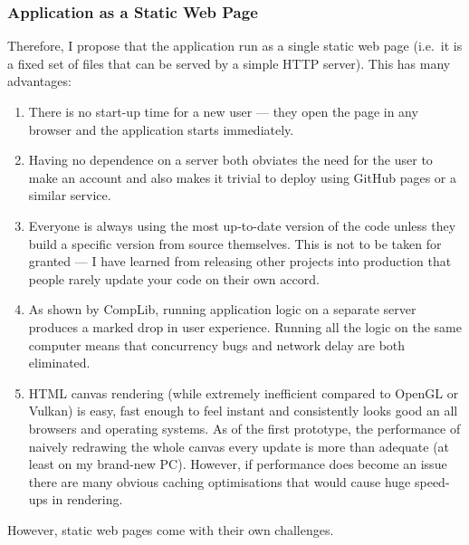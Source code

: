 \documentclass[12pt]{article}
\newcommand{\br}[0]{\vspace{10pt} \noindent}
\begin{document}
\subsubsection{Application as a Static Web Page}

Therefore, I propose that the application run as a single static web page (i.e.\ it is a fixed set
of files that can be served by a simple HTTP server).  This has many advantages:
\begin{enumerate}
    \item There is no start-up time for a new user --- they open the page in any browser and the
        application starts immediately.
    \item Having no dependence on a server both obviates the need for the user to make an account
        and also makes it trivial to deploy using GitHub pages or a similar service.
    \item Everyone is always using the most up-to-date version of the code unless they build a
        specific version from source themselves.  This is not to be taken for granted --- I have
        learned from releasing other projects into production that people rarely update your code on
        their own accord.
    \item As shown by CompLib, running application logic on a separate server produces a marked drop
        in user experience.  Running all the logic on the same computer means that concurrency bugs
        and network delay are both eliminated.
    \item HTML canvas rendering (while extremely inefficient compared to OpenGL or Vulkan) is easy,
        fast enough to feel instant and consistently looks good an all browsers and operating
        systems.  As of the first prototype, the performance of naively redrawing the whole canvas
        every update is more than adequate (at least on my brand-new PC).  However, if performance
        does become an issue there are many obvious caching optimisations that would cause huge
        speed-ups in rendering.
\end{enumerate}

\br{}However, static web pages come with their own challenges.
\end{document}
